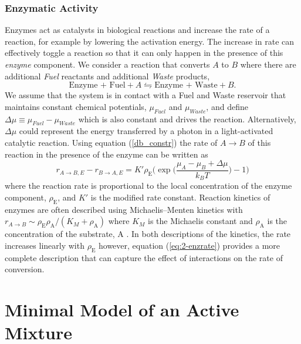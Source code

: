 \subsubsection{Enzymatic Activity}\label{sec:2-enz-act}
Enzymes act as catalysts in biological reactions and increase the rate of a reaction, for example by lowering the activation energy. The increase in rate can effectively toggle a reaction so that it can only happen in the presence of this \textit{enzyme} component. We consider a reaction that converts $A$ to $B$ where there are additional \textit{Fuel} reactants and additional \textit{Waste} products,
\begin{equation}
    \text{Enzyme + Fuel} + A \leftrightharpoons \text{Enzyme + Waste} + B.
\end{equation}
We assume that the system is in contact with a Fuel and Waste reservoir that maintains constant chemical potentials, $\mu_{Fuel}$ and $\mu_{Waste}$, and define $\Delta\mu \equiv \mu_{Fuel}-\mu_{Waste}$ which is also constant and drives the reaction. Alternatively, $\Delta \mu$ could represent the energy transferred by a photon in a light-activated catalytic reaction. Using equation (\ref{db_constr}) the rate of $A \rightarrow B$ of this reaction in the presence of the enzyme can be written as
\begin{equation}
    r_{A \rightarrow B,E} - r_{B \rightarrow A,E} = K'\rho_\textrm{E}\Bigg(\exp\bigg(\frac{\mu_A - \mu_B + \Delta\mu}{k_B T}\bigg)-1\Bigg)
    \label{eq:2-enzrate}
\end{equation}
where the reaction rate is proportional to the local concentration of the enzyme component, $\rho_\textrm{E}$, and $K'$ is the modified rate constant. Reaction kinetics of enzymes are often described using Michaelis–Menten kinetics with $r_{A\rightarrow B}\sim\rho_\textrm{E}\rho_\textrm{A}/(K_{M}+\rho_\textrm{A})$ where $K_M$ is the Michaelis constant and $\rho_\textrm{A}$ is the concentration of the substrate, A \cite{murray_mathematical_1993}. In both  descriptions of the kinetics, the rate increases linearly with $\rho_\textrm{E}$ however, equation (\ref{eq:2-enzrate}) provides a more complete description that can capture the effect of interactions on the rate of conversion.

\section{Minimal Model of an Active Mixture}

